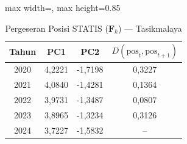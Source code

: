 \begin{table}[H]
\centering
\caption{Pergeseran Posisi STATIS ($\mathbf{F}_k$) --- Tasikmalaya} \label{tab:app2jarak_statis_skor_tasikmalaya}
\begin{adjustbox}{max width=\textwidth, max height=0.85\textheight}
\begin{tabular}{|c|c|c|c|}
\hline
\textbf{Tahun} & \textbf{PC1} & \textbf{PC2} & \textbf{$D(\text{pos}_t, \text{pos}_{t+1})$} \\
\hline
2020 & 4,2221 & -1,7198 & 0,3227 \\
2021 & 4,0840 & -1,4281 & 0,1364 \\
2022 & 3,9731 & -1,3487 & 0,0807 \\
2023 & 3,8965 & -1,3234 & 0,3126 \\
2024 & 3,7227 & -1,5832 & -- \\
\hline
\end{tabular}
\end{adjustbox}
\end{table}